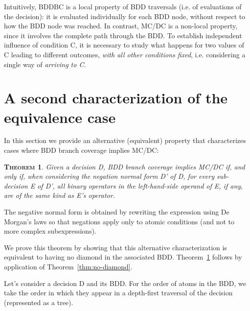 \documentclass[a4paper,12pt,twoside]{article}
\newtheorem{theorem}{\textsc{Theorem}}
\begin{document}
Intuitively, BDDBC is a local property of BDD traversals (i.e. of evaluations
of the decision): it is evaluated individually for each BDD node, without
respect to how the BDD node was reached. In contrast, MC/DC is a non-local
property, since it involves the complete path through the BDD. To establish
independent influence of condition C, it is necessary to study what happens
for two values of C leading to different outcomes, \emph{with all other
conditions fixed}, i.e. considering a single way of \emph{arriving to C}.

\section{A second characterization of the equivalence case}

In this section we provide an alternative (equivalent) property
that characterizes cases where BDD branch coverage implies MC/DC:

\begin{theorem}
  \label{thm:lhs-same-operator}
  Given a decision D, BDD branch coverage implies MC/DC if, and only if, when
  considering the negation normal form D' of D, for every sub-decision E of D',
  all binary operators in the left-hand-side operand of E, if any, are of the
  same kind as E's operator.
\end{theorem}

The negative normal form is obtained by rewriting the expression using
De Morgan's laws so that negations apply only to atomic conditions (and not
to more complex subexpressions).

We prove this theorem by showing that this alternative characterization is
equivalent to having no diamond in the associated BDD.
Theorem~\ref{thm:lhs-same-operator} follows by application of
Theorem~\ref{thm:no-diamond}.

Let's consider a decision D and its BDD. For the order of atoms in the
BDD, we take the order in which they appear in a depth-first traversal
of the decision (represented as a tree).

\end{document}
